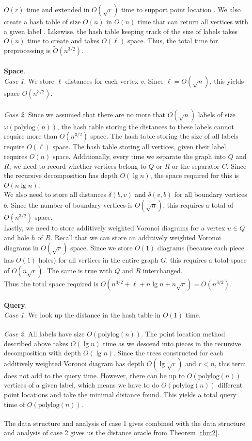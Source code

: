 $O(r)$ time and extended in $O(\sqrt{r})$ time to support point location
\cite{gawrychowski2017better}. We also create a hash table of size $O(n)$ in $O(n)$ time that can return all vertices with a given label \cite{fredman1984storing}.
Likewise, the hash table keeping track of the size of labels takes $O(n)$ time to
create and takes $O(\ell)$ space. Thus, the total time for preprocessing is $\tilde{O}(n^{3/2})$. \\
\\
\textbf{Space}. \\
\textit{Case 1}. We store $\ell$ distances for each vertex $v$. Since $\ell=O(\sqrt{n})$, this
yields space $O(n^{3/2})$. \\
\\
\textit{Case 2}. Since we assumed that there are no more that
$O(\sqrt{n})$ labels of size $\omega(\text{polylog}(n))$, the hash table storing the
distances to these labels cannot require more than $O(n^{3/2})$ space. The hash table
storing the size of all labels require $O(\ell)$ space. The hash table storing all
vertices, given their label, requires $O(n)$ space. Additionally, every time we
separate the graph into $Q$ and $R$, we need to record whether vertices belong to $Q$ or
$R$ or the separator $C$. Since the recursive decomposition has depth $O(\lg n)$, the
space required for this is $O(n\lg n)$. \\
We also need to store all distances $\delta(b,v)$ and $\delta(v,b)$ for all
boundary vertices $b$. Since the number of boundary vertices is $O(\sqrt{n})$, this
requires a total of $O(n^{3/2})$ space. \\
Lastly, we need to store additively weighted Voronoi diagrams for a vertex $u\in Q$ and
hole $h$ of $R$. Recall that we can store an additively weighted Voronoi diagrams in
$O(\sqrt{r})$ space. Since we store $O(1)$ diagrams (because each piece has $O(1)$ holes) for
all vertices in the entire graph $G$, this requires a total space of $O(n\sqrt{r})$. The
same is true with $Q$ and $R$ interchanged. \\
Thus the total space required is $O(n^{3/2}+\ell+n\lg n+n\sqrt{r})=O(n^{3/2})$. \\
\\
\textbf{Query}. \\
\textit{Case 1}. We look up the distance in the hash table in $O(1)$ time.\\
\\
\textit{Case 2}. All labels have size $O(\text{polylog}(n))$. The point location method
described
above takes $O(\lg n)$ time as we descend into pieces in the recursive decomposition with depth
$O(\lg n)$. Since the trees constructed for each additively weighted Voronoi diagram has
depth $O(\lg \sqrt{r})$ and $r<n$, this term does not add to the query time. However,
there can be up to $O(\text{polylog}(n))$ vertices of a given label, which means we have
to do $O(\text{polylog}(n))$ different point locations and take the minimal distance
found. This
yields a total query time of $O(\text{polylog}(n))$. \\
\\
The data structure and analysis of case 1 gives combined with the data structure and
analysis of case 2 gives us the distance oracle from Theorem \ref{thm2}.


